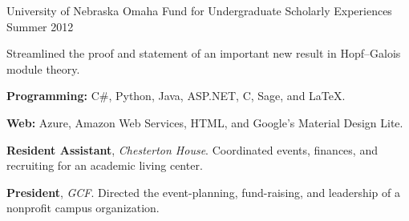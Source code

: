 \documentclass[11pt, letterpaper]{awesome-cv}
\begin{document}
\begin{cventries}
\cventry
	{University of Nebraska Omaha}
	{Fund for Undergraduate Scholarly Experiences}
	{}
	{Summer 2012}
	{
		\begin{cvitems}
			\item{Streamlined the proof and statement of an important new result in Hopf--Galois module theory.}
		\end{cvitems}
	}
	
\end{cventries}








\begin{cvparagraph}

\textbf{Programming:} C\#, Python, Java, ASP.NET, C, Sage, and \LaTeX.

\textbf{Web:} Azure, Amazon Web Services, HTML, and Google's Material Design Lite.
\end{cvparagraph}






\begin{cvparagraph}

\textbf{Resident Assistant}, \emph{Chesterton House}. Coordinated events, finances, and recruiting for an academic living center.

\textbf{President}, \emph{GCF}. Directed the event-planning, fund-raising, and leadership of a nonprofit campus organization.
\end{cvparagraph}
\end{document}
